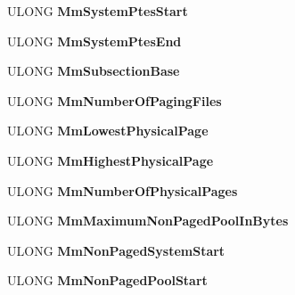 \begin{DoxyCompactItemize}
U\+L\+O\+NG {\bfseries Mm\+System\+Ptes\+Start}
\item 
\mbox{\label{struct___k_d_d_e_b_u_g_g_e_r___d_a_t_a32_a6de4b6c11dffc2d83b8fae5ca01248f6}} 
U\+L\+O\+NG {\bfseries Mm\+System\+Ptes\+End}
\item 
\mbox{\label{struct___k_d_d_e_b_u_g_g_e_r___d_a_t_a32_a1c071ea69452e64bb9824aee596671f9}} 
U\+L\+O\+NG {\bfseries Mm\+Subsection\+Base}
\item 
\mbox{\label{struct___k_d_d_e_b_u_g_g_e_r___d_a_t_a32_a6dfd8fd2e04c68f376ff068365244b0f}} 
U\+L\+O\+NG {\bfseries Mm\+Number\+Of\+Paging\+Files}
\item 
\mbox{\label{struct___k_d_d_e_b_u_g_g_e_r___d_a_t_a32_a39e55bb32da30549adaf843943816c7e}} 
U\+L\+O\+NG {\bfseries Mm\+Lowest\+Physical\+Page}
\item 
\mbox{\label{struct___k_d_d_e_b_u_g_g_e_r___d_a_t_a32_a8b3aec4285e3995a278c7128c623826e}} 
U\+L\+O\+NG {\bfseries Mm\+Highest\+Physical\+Page}
\item 
\mbox{\label{struct___k_d_d_e_b_u_g_g_e_r___d_a_t_a32_aa57f4c9cf4aeb239e34372c9a696001f}} 
U\+L\+O\+NG {\bfseries Mm\+Number\+Of\+Physical\+Pages}
\item 
\mbox{\label{struct___k_d_d_e_b_u_g_g_e_r___d_a_t_a32_acd30e3cda75e7768b5c7117353ccd0b2}} 
U\+L\+O\+NG {\bfseries Mm\+Maximum\+Non\+Paged\+Pool\+In\+Bytes}
\item 
\mbox{\label{struct___k_d_d_e_b_u_g_g_e_r___d_a_t_a32_aeca66223baefd086d4eadc141f002d7f}} 
U\+L\+O\+NG {\bfseries Mm\+Non\+Paged\+System\+Start}
\item 
\mbox{\label{struct___k_d_d_e_b_u_g_g_e_r___d_a_t_a32_aee7902a6c01426a7fbaa434d7bb043ae}} 
U\+L\+O\+NG {\bfseries Mm\+Non\+Paged\+Pool\+Start}
\item 

\end{DoxyCompactItemize}
